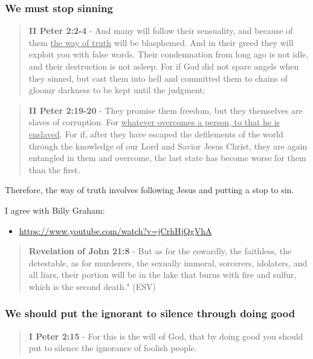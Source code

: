 \documentclass[11pt]{article}
\begin{document}
\subsubsection{We must stop sinning}
\label{sec:org8a095e9}

\begin{quote}
\textbf{II Peter 2:2-4} - And many will follow their sensuality, and because of them \uline{the way of truth} will be blasphemed. And in their greed they will exploit you with false words. Their condemnation from long ago is not idle, and their destruction is not asleep. For if God did not spare angels when they sinned, but cast them into hell and committed them to chains of gloomy darkness to be kept until the judgment;
\end{quote}

\begin{quote}
\textbf{II Peter 2:19-20} - They promise them freedom, but they themselves are slaves of corruption. For \uline{whatever overcomes a person, to that he is enslaved}. For if, after they have escaped the defilements of the world through the knowledge of our Lord and Savior Jesus Christ, they are again entangled in them and overcome, the last state has become worse for them than the first.
\end{quote}

Therefore, the way of truth involves following Jesus and putting a stop to sin.

I agree with Billy Graham:
\begin{itemize}
\item \url{https://www.youtube.com/watch?v=jCrhHjQgVhA}
\end{itemize}

\begin{quote}
\textbf{Revelation of John 21:8} - But as for the cowardly, the faithless, the detestable, as for murderers, the sexually immoral, sorcerers, idolaters, and all liars, their portion will be in the lake that burns with fire and sulfur, which is the second death." (ESV)
\end{quote}

\subsubsection{We should put the ignorant to silence through doing good}
\label{sec:org524e6fc}

\begin{quote}
\textbf{I Peter 2:15} - For this is the will of God, that by doing good you should put to silence the ignorance of foolish people.
\end{quote}
\end{document}
